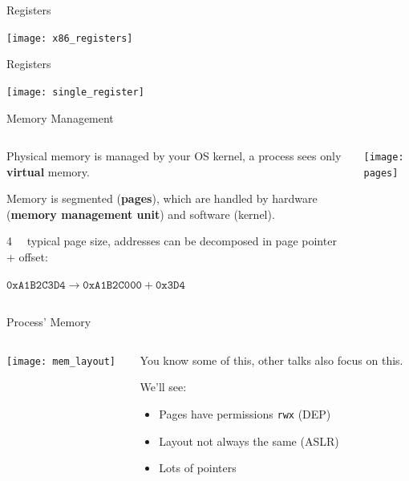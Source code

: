 \documentclass[beamer]{uibk}
\begin{document}
\begin{frame}{Registers}
    \begin{center}
        \texttt{[image: x86\_registers]}
    \end{center}
\end{frame}

\begin{frame}{Registers}
    \begin{center}
        \texttt{[image: single\_register]}
    \end{center}
\end{frame}

\begin{frame}{Memory Management}
    \begin{columns}
        \begin{column}{0.45\textwidth}
            Physical memory is managed by your OS kernel, a process sees only
            \textbf{virtual} memory.
            \medskip

            Memory is segmented (\textbf{pages}), which are handled by hardware
            (\textbf{memory management unit}) and software (kernel).
            \medskip

            \SI{4}{\kibi\byte} typical page size, addresses can be decomposed
            in page pointer + offset:
            \smallskip

            $\mathtt{0xA1B2C3D4} \to \texttt{0xA1B2C000} + \mathtt{0x3D4}$
        \end{column}
        \begin{column}{0.55\textwidth}
            \texttt{[image: pages]}
        \end{column}
    \end{columns}
\end{frame}

\begin{frame}{Process' Memory}
    \begin{columns}
        \begin{column}{0.5\textwidth}
            \begin{center}
                \texttt{[image: mem\_layout]}
            \end{center}
        \end{column}
        \begin{column}{0.5\textwidth}
            You know some of this, other talks also focus on this.
            \bigskip

            We'll see:
            \begin{itemize}
                \item Pages have permissions \texttt{rwx} (DEP)
                \item Layout not always the same (ASLR)
                \item Lots of pointers
            \end{itemize}
        \end{column}
    \end{columns}
\end{frame}
\end{document}
